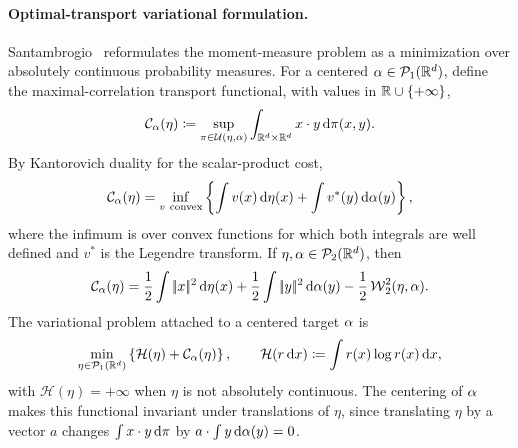 \paragraph{Optimal-transport variational formulation.}
Santambrogio~\cite{Santambrogio2015MomentMeasures} reformulates the moment-measure problem as a minimization over absolutely continuous probability measures. For a centered $\alpha\in\mathcal{P}_1(\mathbb{R}^d)$, define the maximal-correlation transport functional, with values in $\mathbb{R}\cup\{+\infty\}$,
\begin{equation}\label{eq-moment-max-correlation}
	\mathcal C_\alpha(\eta)
	\coloneqq
	\sup_{\pi\in\mathcal{U}(\eta,\alpha)}
	\int_{\mathbb{R}^d\times\mathbb{R}^d} x\cdot y\,\mathrm{d}\pi(x,y).
\end{equation}
By Kantorovich duality for the scalar-product cost,
\begin{equation}\label{eq-moment-max-correlation-dual}
	\mathcal C_\alpha(\eta)
	=
	\inf_{v\ \mathrm{convex}}
	\left\{
		\int v(x)\,\mathrm{d}\eta(x)+\int v^*(y)\,\mathrm{d}\alpha(y)
	\right\},
\end{equation}
where the infimum is over convex functions for which both integrals are well defined and $v^*$ is the Legendre transform. If $\eta,\alpha\in\mathcal{P}_2(\mathbb{R}^d)$, then
\begin{equation}\label{eq-moment-correlation-w2}
	\mathcal C_\alpha(\eta)
	=
	\frac12\int |\!| x |\!|^2\,\mathrm{d}\eta(x)
	+
	\frac12\int |\!| y |\!|^2\,\mathrm{d}\alpha(y)
	-
	\frac12\operatorname{\mathcal{W}}_2^2(\eta,\alpha).
\end{equation}
The variational problem attached to a centered target $\alpha$ is
\begin{equation}\label{eq-moment-measure-variational}
	\min_{\eta\in\mathcal{P}_1(\mathbb{R}^d)}
	\left\{
		\mathcal H(\eta)+\mathcal C_\alpha(\eta)
	\right\},
	\qquad
	\mathcal H(r\,\mathrm{d} x)\coloneqq \int r(x)\log r(x)\,\mathrm{d} x,
\end{equation}
with $\mathcal H(\eta)=+\infty$ when $\eta$ is not absolutely continuous.
The centering of $\alpha$ makes this functional invariant under translations of $\eta$, since translating $\eta$ by a vector $a$ changes $\int x\cdot y\,\mathrm{d}\pi$ by $a\cdot\int y\,\mathrm{d}\alpha(y)=0$.

